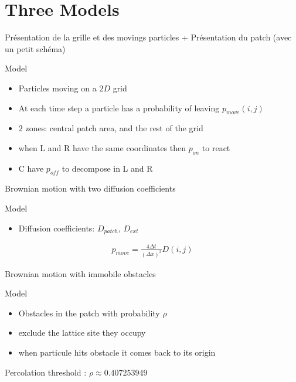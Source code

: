 \documentclass{beamer}
\begin{document}
\section{Three Models}

\begin{frame}
Présentation de la grille et des movings particles
+ 
Présentation du patch (avec un petit schéma)
\begin{block}{Model}
\begin{itemize}
\itemsep1em
\item Particles moving on a $2D$ grid
\item At each time step a particle has a probability of leaving $p_{move}(i,j)$
\item $2$ zones: central patch area, and the rest of the grid
\item when L and R have the same coordinates then $p_{on}$ to react
\item C have $p_{off}$ to decompose in L and R
\end{itemize}
\end{block}

\end{frame}

\begin{frame}{Brownian motion with two diffusion coefficients}
\begin{block}{Model}
\begin{itemize}
\itemsep1em
\item Diffusion coefficients: $D_{patch}$, $D_{ext}$
\end{itemize}
\end{block}

\begin{align*}
p_{move} = \frac{4 \Delta t}{(\Delta x)^2} D(i,j)
\end{align*}

\end{frame}

\begin{frame}{Brownian motion with immobile obstacles}
\begin{block}{Model}
\begin{itemize}
\itemsep1em
\item Obstacles in the patch with probability $\rho$
\item exclude the lattice site they occupy
\item when particule hits obstacle it comes back to its origin
\end{itemize}
\end{block}


Percolation threshold : $\rho \approx 0.407253949$


\end{frame}
\end{document}
